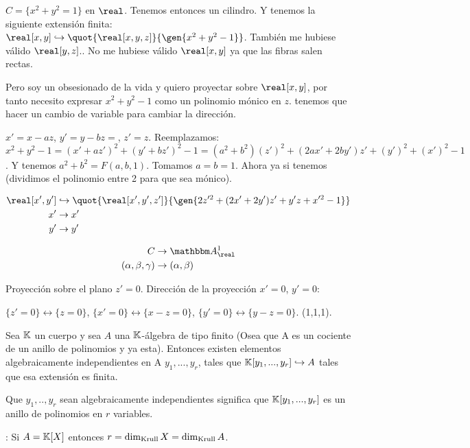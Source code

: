 \begin{example}
	$C=\{x^2+y^2=1\}$ en $\real$. Tenemos entonces un cilindro. Y  tenemos la siguiente extensión finita: $\real[x,y] \hookrightarrow \quot{\real[x,y,z]}{\gen{x^2+y^2-1}}$. También me hubiese válido $\real[y,z]$.. No me hubiese válido $\real[x,y]$ ya que las fibras salen rectas.

	Pero soy un obsesionado de la vida y quiero proyectar sobre $\real[x,y]$, por tanto necesito expresar $x^2+y^2-1$ como un polinomio mónico en $z$. tenemos que hacer un cambio de variable para cambiar la dirección.

	$x' = x-az$, $y'=y-bz=$, $z'=z$. Reemplazamos: $x^2+y^2-1=(x'+az')^2+(y'+bz')^2-1=(a^2+b^2)(z')^2+(2ax'+2by')z'+(y')^2+(x')^2-1$. Y tenemos $a^2+b^2=F(a,b,1)$. Tomamos $a=b=1$. Ahora ya si tenemos (dividimos el polinomio entre 2 para que sea mónico).

	\begin{align*}
		\real[x',y'] & \hookrightarrow \quot{\real[x',y',z']}{\gen{2z'^2+(2x'+2y')z'+y'z+x'^2-1}}\\
		x' & \rightarrow x' \\
		y' & \rightarrow y'
	\end{align*}

	\begin{align*}
		C & \rightarrow \A^1_{\real}\\
		(\alpha, \beta, \gamma) & \rightarrow (\alpha, \beta)
	\end{align*}

	Proyección sobre el plano $z'=0$. Dirección de la proyección $x'=0$, $y'=0$:

	$\{ z'=0 \} \leftrightarrow \{ z=0 \}$, $\{ x'=0 \} \leftrightarrow \{ x-z=0 \}$, $\{ y'=0 \} \leftrightarrow \{ y-z=0 \}$. (1,1,1).
\end{example}

\begin{theorem}
	Sea $\mathbb{K}$ un cuerpo y sea $A$ una $\mathbb{K}$-álgebra de tipo finito (Osea que A es un cociente de un anillo de polinomios y ya esta). Entonces existen elementos algebraicamente independientes en A $y_1,...,y_r$, tales que $\mathbb{K}[y_1,...,y_r] \hookrightarrow A$ tales que esa extensión es finita.
\end{theorem}

Que $y_1,..,y_r$ sean algebraicamente independientes significa que $\mathbb{K}[y_1,...,y_r]$ es un anillo de polinomios en $r$ variables.

\obs: Si $A=\mathbb{K}[X]$ entonces $r=\dim_{\mathrm{Krull}} X=\dim_{\mathrm{Krull}} A$.



